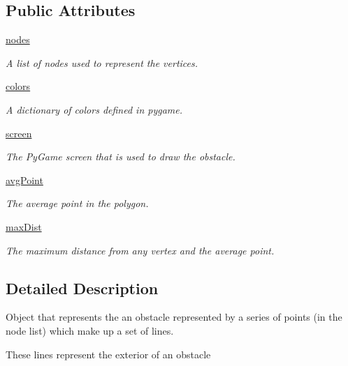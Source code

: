\subsection*{Public Attributes}
\begin{DoxyCompactItemize}
\item 
\hyperlink{classobstacle_1_1PolyObstacle_a125762f0b4a3c9ef8d75c81bc5bc608e}{nodes}
\begin{DoxyCompactList}\small\item\em A list of nodes used to represent the vertices. \end{DoxyCompactList}\item 
\hyperlink{classobstacle_1_1PolyObstacle_a73ce2986866adb38653645c5b84ec0ce}{colors}
\begin{DoxyCompactList}\small\item\em A dictionary of colors defined in pygame. \end{DoxyCompactList}\item 
\hyperlink{classobstacle_1_1PolyObstacle_ad65d210c167b0638ef317ef24670501c}{screen}
\begin{DoxyCompactList}\small\item\em The Py\-Game screen that is used to draw the obstacle. \end{DoxyCompactList}\item 
\hyperlink{classobstacle_1_1PolyObstacle_ae426e9296754e1ba96abcee3b86b3591}{avg\-Point}
\begin{DoxyCompactList}\small\item\em The average point in the polygon. \end{DoxyCompactList}\item 
\hyperlink{classobstacle_1_1PolyObstacle_a14e97b3f09f9ff21f36efc7a58759e5c}{max\-Dist}
\begin{DoxyCompactList}\small\item\em The maximum distance from any vertex and the average point. \end{DoxyCompactList}\end{DoxyCompactItemize}


\subsection{Detailed Description}
Object that represents the an obstacle represented by a series of points (in the node list) which make up a set of lines. 

These lines represent the exterior of an obstacle 

